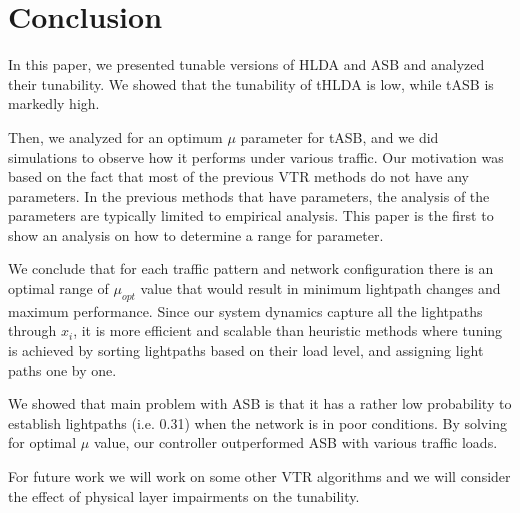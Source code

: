 \documentclass[conference]{IEEEtran}
\begin{document}
\section{Conclusion}\label{conclusion}
In this paper, we  presented tunable versions of HLDA and ASB 
and analyzed their tunability.
We showed that the tunability of tHLDA is   low, while tASB is markedly high.


Then, we analyzed for an optimum $\mu$ parameter for tASB, and we did simulations to 
observe how  it performs under various traffic.
Our motivation was based on the fact that most of the previous VTR methods do not have any parameters. 
In the previous methods that have parameters, the analysis of the parameters are typically limited   to empirical analysis.
This paper is the first to show an analysis on how to determine a range for parameter.
 
We conclude that for each traffic pattern and network configuration there is an optimal range of $\mu_{opt}$ value that would result in minimum lightpath changes and maximum performance.
Since our system dynamics capture all the lightpaths through $x_i$, it is more efficient and scalable than   heuristic methods where
tuning is achieved by sorting lightpaths based on their load level, and assigning light paths one by one. 
 
 
We showed that main problem
with ASB is that it has a rather low probability to establish lightpaths (i.e. 0.31) when the network is in poor conditions. By solving for optimal $\mu$ value, 
our controller outperformed ASB with various traffic loads.
 
For future work we will work on some other VTR algorithms and we will consider the effect of  physical layer impairments
on the tunability.



 
\end{document}
